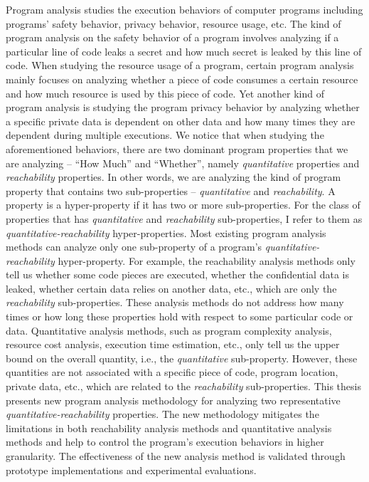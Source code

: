 \begin{abstractpage}
    Program analysis studies the execution behaviors of computer programs
    including programs' safety behavior, privacy behavior, resource usage, etc.
    The kind of program analysis on the safety behavior of a program involves analyzing
    if a particular line of code leaks a secret and how much secret is leaked by this line of code. 
    When studying the resource usage of a program,
    certain program analysis mainly focuses on analyzing whether a piece of code consumes a certain resource and how much resource is used by this piece of code.
    Yet another kind of program analysis is studying the program privacy behavior by analyzing
    whether a specific private data is dependent on other data and how many times they are dependent during multiple executions.
    We notice that when studying the aforementioned behaviors, there are two dominant program properties
    that we are analyzing -- ``How Much'' and ``Whether'',
    namely \emph{quantitative} properties and \emph{reachability} properties.
    In other words,
    we are analyzing the kind of
    program property that contains two sub-properties -- \emph{quantitative} and \emph{reachability}.
    A property is a hyper-property if it has two or more sub-properties.
    For the class of properties that has \emph{quantitative} and \emph{reachability} sub-properties, 
    I refer to them as \emph{quantitative-reachability} hyper-properties.
    Most existing program analysis methods can analyze only one sub-property of a program's
    \emph{quantitative-reachability} hyper-property.
    For example, the reachability analysis methods only tell us whether some code pieces are executed, whether the confidential data is leaked, whether certain data relies on another data, etc., which are only the \emph{reachability} sub-properties.
    These analysis methods do not address how many times or how long these properties hold with respect to some particular code or data. 
    Quantitative analysis methods, such as program complexity analysis, resource cost analysis, execution time estimation, etc., only tell us the upper bound on the overall quantity, i.e., the \emph{quantitative} sub-property.
    However, these quantities are not associated with 
    a specific piece of code, program location, private data, etc., which are related to the \emph{reachability} sub-properties.
    This thesis presents new program analysis methodology for analyzing two representative \emph{quantitative-reachability} properties.
    The new methodology mitigates the limitations in both reachability analysis methods and 
    quantitative analysis methods and
    help to control the program's execution behaviors in higher granularity. 
    The effectiveness of the new analysis method is validated through prototype implementations and experimental evaluations.
    

\end{abstractpage}
